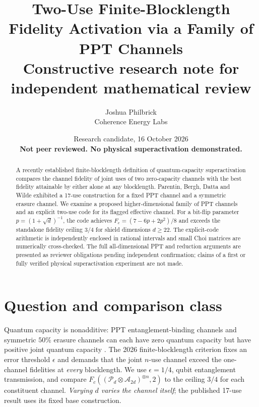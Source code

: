 \documentclass[11pt]{article}
\title{Two-Use Finite-Blocklength Fidelity Activation via a Family of PPT Channels\\\large Constructive research note for independent mathematical review}
\author{Joshua Philbrick\\Coherence Energy Labs}
\date{Research candidate, 16 October 2026\\\textbf{Not peer reviewed. No physical superactivation demonstrated.}}
\begin{document}
\maketitle
\begin{abstract}
A recently established finite-blocklength definition of quantum-capacity superactivation compares the channel fidelity of joint uses of two zero-capacity channels with the best fidelity attainable by either alone at any blocklength. Parentin, Bergh, Datta and Wilde exhibited a 17-use construction for a fixed PPT channel and a symmetric erasure channel. We examine a proposed higher-dimensional family of PPT channels and an explicit two-use code for its flagged effective channel. For a bit-flip parameter $p=(1+\sqrt d)^{-1}$, the code achieves $F_e=(7-6p+2p^2)/8$ and exceeds the standalone fidelity ceiling $3/4$ for shield dimensions $d\geq22$. The explicit-code arithmetic is independently enclosed in rational intervals and small Choi matrices are numerically cross-checked. The full all-dimensional PPT and reduction arguments are presented as reviewer obligations pending independent confirmation; claims of a first or fully verified physical superactivation experiment are not made.
\end{abstract}

\section{Question and comparison class}
Quantum capacity is nonadditive: PPT entanglement-binding channels and symmetric $50\%$ erasure channels can each have zero quantum capacity but have positive joint quantum capacity \cite{smith,parentin}. The 2026 finite-blocklength criterion \cite{parentin} fixes an error threshold $\epsilon$ and demands that the joint $n$-use channel exceed the one-channel fidelities at \emph{every} blocklength. We use $\epsilon=1/4$, qubit entanglement transmission, and compare $F_c((\mathcal P_d\otimes\mathcal A_{2d})^{\otimes n},2)$ to the ceiling $3/4$ for each constituent channel. \emph{Varying $d$ varies the channel itself}; the published 17-use result uses its fixed base construction.
\end{document}
